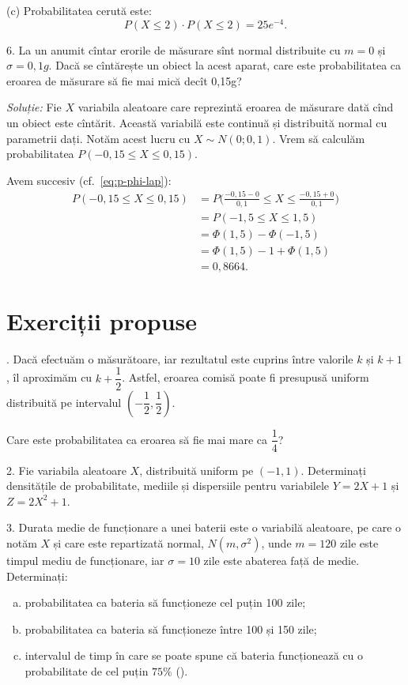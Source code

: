 (c) Probabilitatea cerută este:
\[
  P(X \leq 2) \cdot P(X \leq 2) = 25e^{-4}.
\]

6. La un anumit cîntar erorile de măsurare sînt normal distribuite cu $ m = 0 $ și
$ \sigma = 0,1 g $. Dacă se cîntărește un obiect la acest aparat, care este
probabilitatea ca eroarea de măsurare să fie mai mică decît 0,15g?

\emph{Soluție:} Fie $ X $ variabila aleatoare care reprezintă eroarea de măsurare
dată cînd un obiect este cîntărit. Această variabilă este continuă și distribuită
normal cu parametrii dați. Notăm acest lucru cu $ X \sim N(0; 0,1) $.
Vrem să calculăm probabilitatea $ P(-0,15 \leq X \leq 0,15) $.

Avem succesiv (cf.~\eqref{eq:p-phi-lap}):
\begin{align*}
  P(-0,15 \leq X \leq 0,15) &= P\Big( \frac{-0,15 - 0}{0,1} \leq X \leq \frac{-0,15 + 0}{0,1} \Big) \\
                            &= P(-1,5 \leq X \leq 1,5) \\
                            &= \Phi(1,5) - \Phi(-1,5) \\
                            &= \Phi(1,5) - 1 + \Phi(1,5) \\
                            &= 0,8664.
\end{align*}

\section{Exerciții propuse}

\indent{}. Dacă efectuăm o măsurătoare, iar rezultatul este cuprins între valorile
$ k $ și $ k + 1 $, îl aproximăm cu $ k + \dfrac{1}{2} $. Astfel, eroarea
comisă poate fi presupusă uniform distribuită pe intervalul
$ \left( - \dfrac{1}{2}, \dfrac{1}{2} \right) $.

Care este probabilitatea ca eroarea să fie mai mare ca $ \dfrac{1}{4} $?

\vspace{0.3cm}

2. Fie variabila aleatoare $ X $, distribuită uniform pe $ (-1, 1 ) $.
Determinați densitățile de probabilitate, mediile și dispersiile
pentru variabilele $ Y = 2X + 1 $ și $ Z = 2X^2 + 1 $.

\vspace{0.3cm}

3. Durata medie de funcționare a unei baterii este o variabilă aleatoare,
pe care o notăm $ X $ și care este repartizată normal, $ N(m, \sigma^2 ) $,
unde $ m = 120 $ zile este timpul mediu de funcționare, iar $ \sigma = 10 $
zile este abaterea față de medie. Determinați:
\begin{enumerate}[(a)]
  \item probabilitatea ca bateria să funcționeze cel puțin 100 zile;
  \item probabilitatea ca bateria să funcționeze între 100 și 150 zile;
  \item intervalul de timp în care se poate spune că bateria funcționează
  cu o probabilitate de cel puțin $ 75\% $ ().
\end{enumerate}

